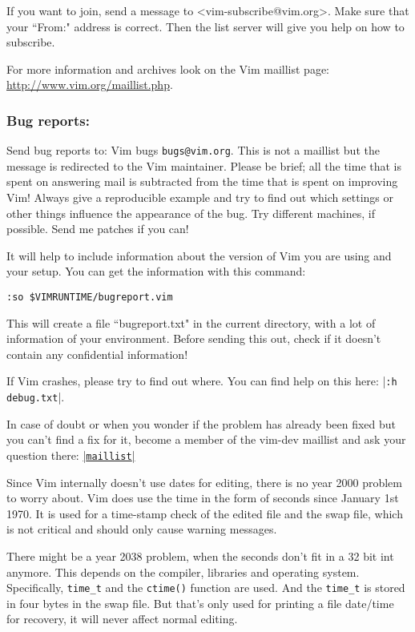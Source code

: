 \label{subscribe-maillist}
If you want to join, send a message to <vim-subscribe@vim.org>.
Make sure that your ``From:" address is correct.
Then the list server will give you help on how to subscribe.


\label{maillist-archive}
For more information and archives look on the Vim maillist page: \url{http://www.vim.org/maillist.php}. %

\subsubsection{Bug reports:}
\label{bugs}
\label{bug-reports}
\label{bugreport.vim}
Send bug reports to: Vim bugs \texttt{bugs@vim.org}.
This is not a maillist but the message is redirected to the Vim maintainer.
Please be brief; all the time that is spent on answering mail is subtracted from the time that is spent on improving Vim!
Always give a reproducible example and try to find out which settings or other things influence the appearance of the bug.
Try different machines, if possible.
Send me patches if you can!

It will help to include information about the version of Vim you are using and your setup.
You can get the information with this command:
\begin{Verbatim}[samepage=true]
	 :so $VIMRUNTIME/bugreport.vim
\end{Verbatim}
This will create a file ``bugreport.txt" in the current directory, with a lot of information of your environment.
Before sending this out, check if it doesn't contain any confidential information!

If Vim crashes, please try to find out where.
You can find help on this here: |\texttt{:h debug.txt}|.

In case of doubt or when you wonder if the problem has already been fixed but
you can't find a fix for it, become a member of the vim-dev maillist and ask
your question there: \hyperref[maillist]{|\texttt{maillist}|}


\label{year-2000}
\label{Y2K}
Since Vim internally doesn't use dates for editing, there is no year 2000 problem to worry about.
Vim does use the time in the form of seconds since January 1st 1970.
It is used for a time-stamp check of the edited file and the swap file, which is not critical and should only cause warning messages.

There might be a year 2038 problem, when the seconds don't fit in a 32 bit int anymore.
This depends on the compiler, libraries and operating system.
Specifically, \texttt{time\_t} and the \texttt{ctime()} function are used.
And the \texttt{time\_t} is stored in four bytes in the swap file.
But that's only used for printing a file date/time for recovery, it will never affect normal editing.

